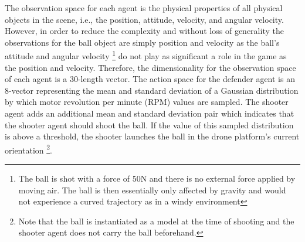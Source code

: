 \documentclass{article}
\begin{document}
\noindent
The observation space for each agent is the physical properties of all physical objects in the scene, i.e., the position, attitude, velocity, and angular velocity. 
However, in order to reduce the complexity and without loss of generality the observations for the ball object are simply position and velocity as the ball's attitude and angular velocity \footnote{The ball is shot with a force of 50N and there is no external force applied by moving air. The ball is then essentially only affected by gravity and would not experience a curved trajectory as in a windy environment} do not play as significant a role in the game as the position and velocity. 
Therefore, the dimensionality for the observation space of each agent is a 30-length vector. 
The action space for the defender agent is an 8-vector representing the mean and standard deviation of a Gaussian distribution by which motor revolution per minute (RPM) values are sampled. 
The shooter agent adds an additional mean and standard deviation pair which indicates that the shooter agent should shoot the ball. 
If the value of this sampled distribution is above a threshold, the shooter launches the ball in the drone platform's current orientation \footnote{Note that the ball is instantiated as a model at the time of shooting and the shooter agent does not carry the ball beforehand.}. 
\end{document}
